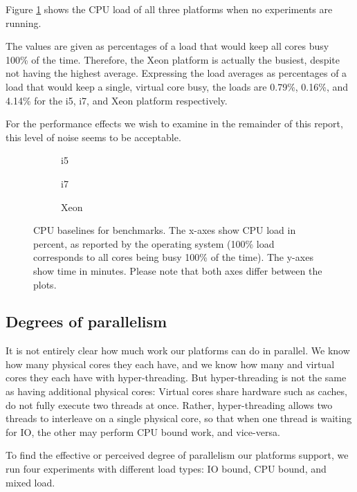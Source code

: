 Figure \ref{fig:cpuload} shows the CPU load of all three platforms when no
experiments are running.

The values are given as percentages of a load that would keep all cores busy
100\% of the time. Therefore, the Xeon platform is actually the busiest, despite
not having the highest average. Expressing the load averages as percentages of a
load that would keep a single, virtual core busy, the loads are 0.79\%, 0.16\%,
and 4.14\% for the i5, i7, and Xeon platform respectively.

For the performance effects we wish to examine in the remainder of this report,
this level of noise seems to be acceptable.

\begin{figure}[hbpt]
	\graphicspath{{plots/}}
	\begin{subfigure}{1\textwidth}
		
		\caption{i5}
	\end{subfigure}
	\begin{subfigure}{1\textwidth}
		
		\caption{i7}
	\end{subfigure}
	\begin{subfigure}{1\textwidth}
		
		\caption{Xeon}
	\end{subfigure}
	\caption{CPU baselines for benchmarks. The x-axes show CPU load in
	percent, as reported by the operating system (100\% load corresponds to
	all cores being busy 100\% of the time). The y-axes show time in
	minutes. Please note that both axes differ between the plots.}
	\label{fig:cpuload}
\end{figure}

\subsection{Degrees of parallelism}
It is not entirely clear how much work our platforms can do in parallel. We know
how many physical cores they each have, and we know how many and virtual cores
they each have with hyper-threading. But hyper-threading is not the same as
having additional physical cores: Virtual cores share hardware such as caches,
do not fully execute two threads at once. Rather, hyper-threading allows two
threads to interleave on a single physical core, so that when one thread is
waiting for IO, the other may perform CPU bound work, and vice-versa.

To find the effective or perceived degree of parallelism our platforms support,
we run four experiments with different load types: IO bound, CPU bound, and mixed
load. 

